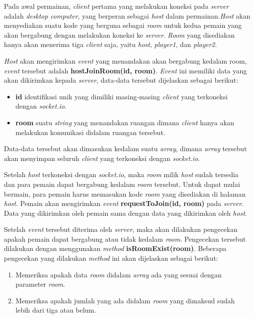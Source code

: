 Pada awal permainan, \textit{client} pertama yang melakukan koneksi pada \textit{server} adalah \textit{desktop computer}, yang berperan sebagai \textit{host} dalam permainan.\textit{Host} akan menyediakan suatu kode yang berguna sebagai \textit{room} untuk kedua pemain yang akan bergabung dengan melakukan koneksi ke \textit{server}. \textit{Room} yang disediakan hanya akan menerima tiga \textit{client} saja, yaitu \textit{host}, \textit{player1}, dan \textit{player2}.

\textit{Host} akan mengirimkan \textit{event} yang menandakan akan bergabung kedalam room, \textit{event} tersebut adalah \textbf{hostJoinRoom(id, room)}. \textit{Event} ini memiliki data yang akan dikirimkan kepada \textit{server}, data-data tersebut dijelaskan sebagai berikut:
\begin{itemize}
	\item \textbf{id} identifikasi unik yang dimiliki masing-masing \textit{client} yang terkoneksi dengan \textit{socket.io}.
	\item \textbf{room} suatu \textit{string} yang menandakan ruangan dimana \textit{client} hanya akan melakukan komunikasi didalam ruangan tersebut.
\end{itemize}
Data-data tersebut akan dimasukan kedalam suatu \textit{array}, dimana \textit{array} tersebut akan menyimpan seluruh \textit{client} yang terkoneksi dengan \textit{socket.io}.

Setelah \textit{host} terkoneksi dengan \textit{socket.io}, maka \textit{room} milik \textit{host} sudah tersedia dan para pemain dapat bergabung kedalam \textit{room} tersebut. Untuk dapat mulai bermain, para pemain harus memasukan kode \textit{room} yang disediakan di halaman \textit{host}. Pemain akan mengirimkan \textit{event} \textbf{requestToJoin(id, room)} pada \textit{server}. Data yang dikirimkan oleh pemain sama dengan data yang dikirimkan oleh \textit{host}. 

Setelah \textit{event} tersebut diterima oleh \textit{server}, maka akan dilakukan pengecekan apakah pemain dapat bergabung atau tidak kedalam \textit{room}. Pengecekan tersebut dilakukan dengan menggunakan \textit{method} \textbf{isRoomExist(room)}. Beberapa pengecekan yang dilakukan \textit{method} ini akan dijelaskan sebagai berikut:
\begin{enumerate}
	\item Memeriksa apakah data \textit{room} didalam \textit{array} ada yang sesuai dengan parameter \textit{room}.
	\item Memeriksa apakah jumlah yang ada didalam \textit{room} yang dimaksud sudah lebih dari tiga atau belum.
\end{enumerate}

